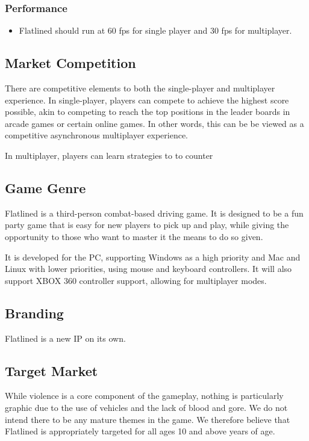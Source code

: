 \documentclass{article}
\newcommand{\name}{Flatlined}
\theoremstyle{definition}
\begin{document}
\subsubsection{Performance}

\begin{itemize}
  \item \name{} should run at 60 fps for single player and 30 fps for
    multiplayer.
\end{itemize}

\subsection{Market Competition}

There are competitive elements to both the single-player and multiplayer
experience. In single-player, players can compete to achieve the highest score
possible, akin to competing to reach the top positions in the leader boards
in arcade games or certain online games. In other words, this can be be viewed
as a competitive asynchronous multiplayer experience.

In multiplayer, players can learn strategies to to counter 

\subsection{Game Genre} %

\name{} is a third-person combat-based driving game. It is designed to be
a fun party game that is easy for new players to pick up and play, while giving
the opportunity to those who want to master it the means to do so given.

It is developed for the PC, supporting Windows as a high priority and Mac and
Linux with lower priorities, using mouse and keyboard controllers. It will also
support XBOX 360 controller support, allowing for multiplayer modes.

\subsection{Branding}

\name{} is a new IP on its own.

\subsection{Target Market}

While violence is a core component of the gameplay, nothing is particularly
graphic due to the use of vehicles and the lack of blood and gore. We do not
intend there to be any mature themes in the game. We therefore believe that
\name{} is appropriately targeted for all ages 10 and above years of age.
\end{document}
